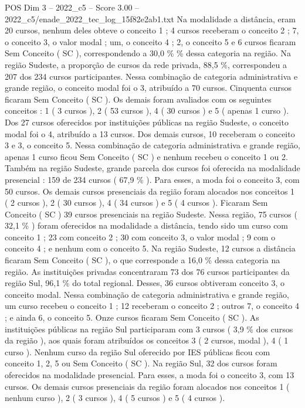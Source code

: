 \begin{textsample}{POS Dim 3 – 2022\_c5 – Score 3.00 – 2022\_c5/enade\_2022\_tec\_log\_15f82e2ab1.txt}
Na modalidade a distância, eram 20 cursos, nenhum deles obteve o conceito 1 ; 4 cursos receberam o conceito 2 ; 7, o conceito 3, o valor modal ; um, o conceito 4 ; 2, o conceito 5 e 6 cursos ficaram Sem Conceito ( SC ), correspondendo a 30,0 \% \% dessa categoria na região.
Na região Sudeste, a proporção de cursos da rede privada, 88,5 \%, correspondeu a 207 dos 234 cursos participantes.
Nessa combinação de categoria administrativa e grande região, o conceito modal foi o 3, atribuído a 70 cursos.
Cinquenta cursos ficaram Sem Conceito ( SC ).
Os demais foram avaliados com os seguintes conceitos : 1 ( 3 cursos ), 2 ( 53 cursos ), 4 ( 30 cursos ) e 5 ( apenas 1 curso ).
Dos 27 cursos oferecidos por instituições públicas na região Sudeste, o conceito modal foi o 4, atribuído a 13 cursos.
Dos demais cursos, 10 receberam o conceito 3 e 3, o conceito 5.
Nessa combinação de categoria administrativa e grande região, apenas 1 curso ficou Sem Conceito ( SC ) e nenhum recebeu o conceito 1 ou 2.
Também na região Sudeste, grande parcela dos cursos foi oferecida na modalidade presencial : 159 de 234 cursos ( 67,9 \% ).
Para esses, a moda foi o conceito 3, com 50 cursos.
Os demais cursos presenciais da região foram alocados nos conceitos 1 ( 2 cursos ), 2 ( 30 cursos ), 4 ( 34 cursos ) e 5 ( 4 cursos ).
Ficaram Sem Conceito ( SC ) 39 cursos presenciais na região Sudeste.
Nessa região, 75 cursos ( 32,1 \% ) foram oferecidos na modalidade a distância, tendo sido um curso com conceito 1 ; 23 com conceito 2 ; 30 com conceito 3, o valor modal ; 9 com o conceito 4 ; e nenhum com o conceito 5.
Na região Sudeste, 12 cursos a distância ficaram Sem Conceito ( SC ), o que corresponde a 16,0 \% dessa categoria na região.
As instituições privadas concentraram 73 dos 76 cursos participantes da região Sul, 96,1 \% do total regional.
Desses, 36 cursos obtiveram conceito 3, o conceito modal.
Nessa combinação de categoria administrativa e grande região, um curso recebeu o conceito 1 ; 12 receberam o conceito 2 ; outros 7, o conceito 4 ; e ainda 6, o conceito 5.
Onze cursos ficaram Sem Conceito ( SC ).
As instituições públicas na região Sul participaram com 3 cursos ( 3,9 \% dos cursos da região ), aos quais foram atribuídos os conceitos 3 ( 2 cursos, modal ), 4 ( 1 curso ).
Nenhum curso da região Sul oferecido por IES públicas ficou com conceito 1, 2, 5 ou Sem Conceito ( SC ).
Na região Sul, 32 dos cursos foram oferecidos na modalidade presencial.
Para esses, a moda foi o conceito 3, com 13 cursos.
Os demais cursos presenciais da região foram alocados nos conceitos 1 ( nenhum curso ), 2 ( 3 cursos ), 4 ( 5 cursos ) e 5 ( 4 cursos ).

\end{textsample}
